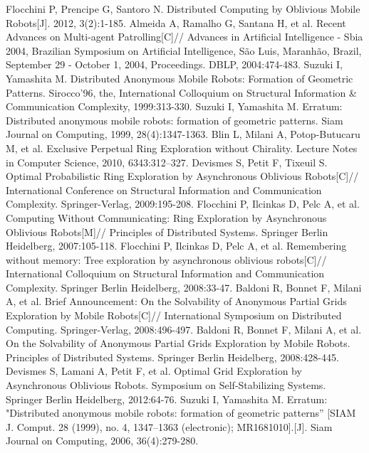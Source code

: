 \begin{thebibliography}{0}
   Flocchini P, Prencipe G, Santoro N. Distributed Computing by Oblivious Mobile Robots[J]. 2012, 3(2):1-185.
   Almeida A, Ramalho G, Santana H, et al. Recent Advances on Multi-agent Patrolling[C]// Advances in Artificial Intelligence - Sbia 2004, Brazilian Symposium on Artificial Intelligence, São Luis, Maranhão, Brazil, September 29 - October 1, 2004, Proceedings. DBLP, 2004:474-483.
   Suzuki I, Yamashita M. Distributed Anonymous Mobile Robots: Formation of Geometric Patterns. Sirocco'96, the, International Colloquium on Structural Information & Communication Complexity, 1999:313-330.
   Suzuki I, Yamashita M. Erratum: Distributed anonymous mobile robots: formation of geometric patterns. Siam Journal on Computing, 1999, 28(4):1347-1363.
   Blin L, Milani A, Potop-Butucaru M, et al. Exclusive Perpetual Ring Exploration without Chirality. Lecture Notes in Computer Science, 2010, 6343:312--327.
   Devismes S, Petit F, Tixeuil S. Optimal Probabilistic Ring Exploration by Asynchronous Oblivious Robots[C]// International Conference on Structural Information and Communication Complexity. Springer-Verlag, 2009:195-208.
   Flocchini P, Ilcinkas D, Pelc A, et al. Computing Without Communicating: Ring Exploration by Asynchronous Oblivious Robots[M]// Principles of Distributed Systems. Springer Berlin Heidelberg, 2007:105-118.
   Flocchini P, Ilcinkas D, Pelc A, et al. Remembering without memory: Tree exploration by asynchronous oblivious robots[C]// International Colloquium on Structural Information and Communication Complexity. Springer Berlin Heidelberg, 2008:33-47.
   Baldoni R, Bonnet F, Milani A, et al. Brief Announcement: On the Solvability of Anonymous Partial Grids Exploration by Mobile Robots[C]// International Symposium on Distributed Computing. Springer-Verlag, 2008:496-497.
   Baldoni R, Bonnet F, Milani A, et al. On the Solvability of Anonymous Partial Grids Exploration by Mobile Robots. Principles of Distributed Systems. Springer Berlin Heidelberg, 2008:428-445.
   Devismes S, Lamani A, Petit F, et al. Optimal Grid Exploration by Asynchronous Oblivious Robots. Symposium on Self-Stabilizing Systems. Springer Berlin Heidelberg, 2012:64-76.
   Suzuki I, Yamashita M. Erratum: "Distributed anonymous mobile robots: formation of geometric patterns'' [SIAM J. Comput. 28 (1999), no. 4, 1347–1363 (electronic); MR1681010].[J]. Siam Journal on Computing, 2006, 36(4):279-280.

\end{thebibliography}

